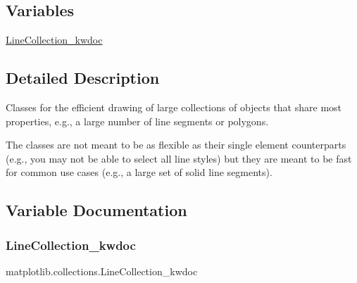 \subsection*{Variables}
\begin{DoxyCompactItemize}
\item 
\hyperlink{namespacematplotlib_1_1collections_a0d18891de4bfb74efabb890a08c52304}{Line\+Collection\+\_\+kwdoc}
\end{DoxyCompactItemize}


\subsection{Detailed Description}
\begin{DoxyVerb}Classes for the efficient drawing of large collections of objects that
share most properties, e.g., a large number of line segments or
polygons.

The classes are not meant to be as flexible as their single element
counterparts (e.g., you may not be able to select all line styles) but
they are meant to be fast for common use cases (e.g., a large set of solid
line segments).
\end{DoxyVerb}
 

\subsection{Variable Documentation}
\mbox{\label{namespacematplotlib_1_1collections_a0d18891de4bfb74efabb890a08c52304}} 
\subsubsection{\texorpdfstring{Line\+Collection\+\_\+kwdoc}{LineCollection\_kwdoc}}
{\footnotesize\ttfamily matplotlib.\+collections.\+Line\+Collection\+\_\+kwdoc}


